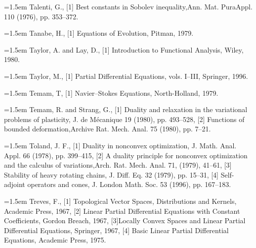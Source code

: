 \noindent\hangindent=1.5em Talenti, G., \hypertarget{ref:Talenti-1}{[1]} Best constants in Sobolev inequality,Ann. Mat. PuraAppl. 110 (1976), pp. 353--372.\par{}
\noindent\hangindent=1.5em Tanabe, H., \hypertarget{ref:Tanabe-1}{[1]} Equations of Evolution, Pitman, 1979.\par{}
\noindent\hangindent=1.5em Taylor, A. and Lay, D., \hypertarget{ref:TaylorLay-1}{[1]} Introduction to Functional Analysis, Wiley, 1980.\par{}
\noindent\hangindent=1.5em Taylor, M., \hypertarget{ref:Taylor-1}{[1]} Partial Differential Equations, vols. I--III, Springer, 1996.\par{}
\noindent\hangindent=1.5em Temam, T, \hypertarget{ref:Temam-1}{[1]} Navier--Stokes Equations, North-Holland, 1979.\par{}
\noindent\hangindent=1.5em Temam, R. and Strang, G., \hypertarget{ref:TemamStrang-1}{[1]} Duality and relaxation in the variational problems of plasticity, J. de Mécanique 19 (1980), pp. 493--528, \hypertarget{ref:TemamStrang-2}{[2]} Functions of bounded deformation,Archive Rat. Mech. Anal. 75 (1980), pp. 7--21.\par{}
\noindent\hangindent=1.5em Toland, J. F., \hypertarget{ref:Toland-1}{[1]} Duality in nonconvex optimization, J. Math. Anal. Appl. 66 (1978), pp. 399--415, \hypertarget{ref:Toland-2}{[2]} A duality principle for nonconvex optimization and the calculus of variations,Arch. Rat. Mech. Anal. 71, (1979), 41--61, \hypertarget{ref:Toland-3}{[3]} Stability of heavy rotating chains, J. Diff. Eq. 32 (1979), pp. 15--31, \hypertarget{ref:Toland-4}{[4]} Self-adjoint operators and cones, J. London Math. Soc. 53 (1996), pp. 167--183.\par{}
\noindent\hangindent=1.5em Treves, F., \hypertarget{ref:Treves-1}{[1]} Topological Vector Spaces, Distributions and Kernels, Academic Press, 1967, \hypertarget{ref:Treves-2}{[2]} Linear Partial Differential Equations with Constant Coefficients, Gordon Breach, 1967, \hypertarget{ref:Treves-3}{[3]}Locally Convex Spaces and Linear Partial Differential Equations, Springer, 1967, \hypertarget{ref:Treves-4}{[4]} Basic Linear Partial Differential Equations, Academic Press, 1975.\par{}
